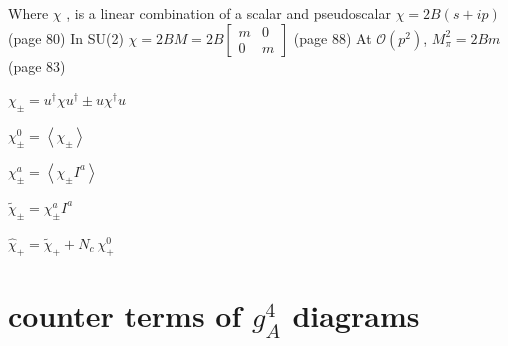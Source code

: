 \documentclass{article}
\begin{document}
Where $ \chi $ , is a linear combination of a scalar and pseudoscalar $ \chi = 2B(s+ip)$ \cite{scherer2003introduction} (page 80)
In SU(2) $\chi = 2B M = 2B \left[ \begin{array}{cc}
	m & 0 \\
	0 & m\end{array} \right] $ \cite{scherer2003introduction} (page 88)	
At $\mathcal{O}(p^2)$, $ M_{\pi}^2= 2Bm $ \cite{scherer2003introduction} (page 83)



\vspace{5mm}


$ \chi_{\pm}  = u^{\dagger} \chi u^{\dagger} \pm u \chi^{\dagger} u $ 

$ \chi_{\pm}^{0} =\left\langle\chi_{\pm}\right\rangle $

$  \chi_{\pm}^{a}  = \left\langle\chi_{\pm} I^a\right\rangle   $

$ \tilde{\chi}_{\pm} = \chi_{\pm}^{a} I^{a} $

\vspace{5mm}

$ \hat{\chi}_{+} = \tilde{\chi}_{+} + N_c \: \chi_{+}^{0} $





\newpage
\section{counter terms of $g_A^4$ diagrams}
\end{document}
